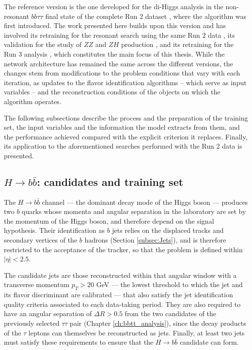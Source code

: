 The reference version is the one developed for the di-Higgs analysis in the non-resonant $bb\tau\tau$ final state of the complete Run 2 dataset \cite{CMS-HIG-20-010}, where the algorithm was first introduced. The work presented here builds upon this version and has involved its retraining for the resonant search using the same Run 2 data \cite{CMS-PAS-B2G-24-011}, its validation for the study of $ZZ$ and $ZH$ production \cite{CMS:2026zzzh}, and its retraining for the Run 3 analysis \cite{CMS-PAS-HIG-25-008}, which constitutes the main focus of this thesis. While the network architecture has remained the same across the different versions, the changes stem from modifications to the problem conditions that vary with each iteration, as updates to the flavor identification algorithms -- which serve as input variables -- and the reconstruction conditions of the objects on which the algorithm operates.\medskip 

The following subsections describe the process and the preparation of the training set, the input variables and the information the model extracts from them, and the performance achieved compared with the explicit criterion it replaces. Finally, its application to the aforementioned searches performed with the Run 2 data is presented.

\subsection{\texorpdfstring{$H\to b\bar{b}$}{H->bb}: candidates and training set}
\label{subsec:hhbtag_dataset}
The $H\to b\bar{b}$ channel — the dominant decay mode of the Higgs boson — produces two $b$ quarks whose momenta and angular separation in the laboratory are set by the momentum of the Higgs boson, and therefore depend on the signal hypothesis. Their identification as $b$ jets relies on the displaced tracks and secondary vertices of the $b$ hadrons (Section \ref{subsec:Jets}), and is therefore restricted to the acceptance of the tracker, so that the problem is defined within $|\eta| < 2.5$.\medskip

The candidate jets are those reconstructed within that angular window with a transverse momentum $p_T > 20$ GeV — the lowest threshold to which the jet and its flavor discriminant are calibrated — that also satisfy the jet identification quality criteria associated to each data-taking period. They are also required to have an angular separation of $\Delta R > 0.5$ from the two candidates of the previously selected $\tau\tau$ pair (Chapter \ref{ch:bbtt_analysis}), since the decay products of the $\tau$ leptons can themselves be reconstructed as jets. Finally, at least two jets must satisfy these requirements to ensure that the $H\rightarrow b\bar{b}$ candidate can form.\medskip

